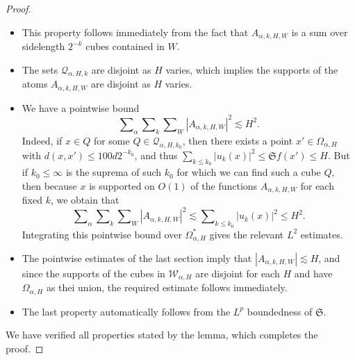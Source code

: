 \begin{proof}
\begin{itemize}
        \item This property follows immediately from the fact that $A_{\alpha,k,H,W}$ is a sum over sidelength $2^{-k}$ cubes contained in $W$.

        \item The sets $\mathcal{Q}_{\alpha,H,k}$ are disjoint as $H$ varies, which implies the supports of the atoms $A_{\alpha,k,H,W}$ are disjoint as $H$ varies.

        \item We have a pointwise bound
    \begin{equation}
        \sum\nolimits_\alpha \sum\nolimits_k \sum\nolimits_W |A_{\alpha,k,H,W}|^2 \lesssim H^2.
    \end{equation}
    Indeed, if $x \in Q$ for some $Q \in \mathcal{Q}_{\alpha,H,k_0}$, then there exists a point $x' \in \Omega_{\alpha,H}$ with $d(x,x') \leq 100 d 2^{-k_0}$, and thus $\sum\nolimits_{k \leq k_0} |u_k(x)|^2 \leq \mathfrak{S} f(x') \leq H$. But if $k_0 \leq \infty$ is the suprema of such $k_0$ for which we can find such a cube $Q$, then because $x$ is supported on $O(1)$ of the functions $A_{\alpha,k,H,W}$ for each fixed $k$, we obtain that
    \begin{equation}
        \sum\nolimits_\alpha \sum\nolimits_k \sum\nolimits_W |A_{\alpha,k,H,W}|^2 \lesssim \sum\nolimits_{k \leq k_0} |u_k(x)|^2 \leq H^2.
    \end{equation}
    Integrating this pointwise bound over $\Omega_{\alpha,H}^*$ gives the relevant $L^2$ estimates.

    \item The pointwise estimates of the last section imply that $|A_{\alpha,k,H,W}| \lesssim H$, and since the supports of the cubes in $\mathcal{W}_{\alpha,H}$ are disjoint for each $H$ and have $\Omega_{\alpha,H}$ as thei union, the required estimate follows immediately.

    \item The last property automatically follows from the $L^p$ boundedness of $\mathfrak{S}$.
    \end{itemize}
    We have verified all properties stated by the lemma, which completes the proof.
\end{proof}

